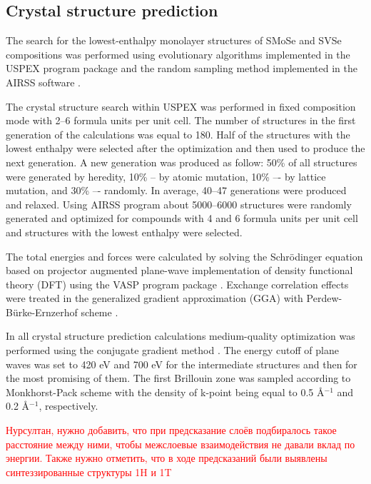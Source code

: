 \documentclass[a4paperm]{article}
\begin{document}
\subsection*{Crystal structure prediction}

The search for the lowest-enthalpy monolayer structures of SMoSe and SVSe compositions was performed using evolutionary algorithms implemented in the USPEX program package \cite{uspex1,uspex2,uspex3} and the random sampling method implemented in the AIRSS software \cite{airss1,airss2}.

The crystal structure search within USPEX was performed in fixed composition mode with 2--6 formula units per unit cell.
The number of structures in the first generation of the calculations was equal to 180.
Half of the structures with the lowest enthalpy were selected after the optimization and then used to produce the next generation.
A new generation was produced as follow: 50\% of all structures were generated by heredity, 10\% -- by atomic mutation, 10\% –- by lattice mutation, and 30\% –- randomly.
In average, 40--47 generations were produced and relaxed.
Using AIRSS program about 5000--6000 structures were randomly generated and optimized for compounds with 4 and 6 formula units per unit cell and structures with the lowest enthalpy were selected.

The total energies and forces were calculated by solving the Schr\"{o}dinger equation based on projector augmented plane-wave implementation \cite{blochl1994projector} of density functional theory (DFT) using the VASP program package \cite{vasp1,vasp2}.
Exchange correlation effects were treated in the generalized gradient approximation (GGA) with Perdew-B\"{u}rke-Ernzerhof scheme \cite{pbe}.

In all crystal structure prediction calculations medium-quality optimization was performed using the conjugate gradient method \cite{conjugate_gradient}. 
The energy cutoff of plane waves was set to 420 eV and 700 eV for the intermediate structures and then for the most promising of them. 
The first Brillouin zone was sampled according to Monkhorst-Pack scheme \cite{monkhorst1976special} with the density of k-point being equal to 0.5 \AA$^{-1}$ and 0.2 \AA$^{-1}$, respectively. 

\textcolor{red}{Нурсултан, нужно добавить, что при предсказание слоёв подбиралось такое расстояние между ними, чтобы межслоевые взаимодействия не давали вклад по энергии. Также нужно отметить, что в ходе предсказаний были выявлены синтеззированные структуры 1H и 1T}
\end{document}
